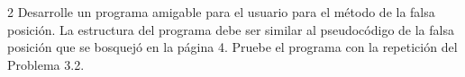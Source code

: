 \documentclass[12pt,letterpaper]{article}
\theoremstyle{definition}
\theoremstyle{plain}
\theoremstyle{remark}
\begin{document}
\begin{multicols}{2}
{\problem Desarrolle un programa amigable para el usuario para el método de la falsa posición. La estructura del programa debe ser similar al pseudocódigo de la falsa posición que se bosquejó en la página 4. Pruebe el programa con la repetición del Problema 3.2.}
\end{multicols}
\end{document}
